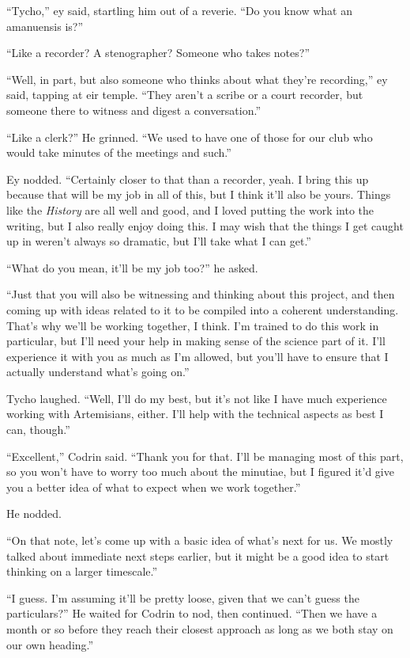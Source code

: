 ``Tycho,'' ey said, startling him out of a reverie. ``Do you know what an amanuensis is?''

``Like a recorder? A stenographer? Someone who takes notes?''

``Well, in part, but also someone who thinks about what they're recording,'' ey said, tapping at eir temple. ``They aren't a scribe or a court recorder, but someone there to witness and digest a conversation.''

``Like a clerk?'' He grinned. ``We used to have one of those for our club who would take minutes of the meetings and such.''

Ey nodded. ``Certainly closer to that than a recorder, yeah. I bring this up because that will be my job in all of this, but I think it'll also be yours. Things like the \emph{History} are all well and good, and I loved putting the work into the writing, but I also really enjoy doing this. I may wish that the things I get caught up in weren't always so dramatic, but I'll take what I can get.''

``What do you mean, it'll be my job too?'' he asked.

``Just that you will also be witnessing and thinking about this project, and then coming up with ideas related to it to be compiled into a coherent understanding. That's why we'll be working together, I think. I'm trained to do this work in particular, but I'll need your help in making sense of the science part of it. I'll experience it with you as much as I'm allowed, but you'll have to ensure that I actually understand what's going on.''

Tycho laughed. ``Well, I'll do my best, but it's not like I have much experience working with Artemisians, either. I'll help with the technical aspects as best I can, though.''

``Excellent,'' Codrin said. ``Thank you for that. I'll be managing most of this part, so you won't have to worry too much about the minutiae, but I figured it'd give you a better idea of what to expect when we work together.''

He nodded.

``On that note, let's come up with a basic idea of what's next for us. We mostly talked about immediate next steps earlier, but it might be a good idea to start thinking on a larger timescale.''

``I guess. I'm assuming it'll be pretty loose, given that we can't guess the particulars?'' He waited for Codrin to nod, then continued. ``Then we have a month or so before they reach their closest approach as long as we both stay on our own heading.''

